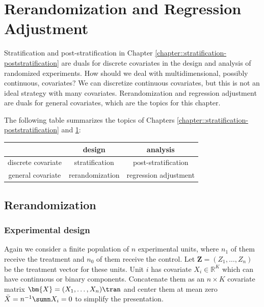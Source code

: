 
\chapter{Rerandomization and Regression Adjustment}
 \label{chapter:rerandomization-regression}


Stratification and post-stratification in Chapter  \ref{chapter::stratification-poststratification} are duals for discrete covariates in the design and analysis of randomized experiments.  How should we deal with multidimensional, possibly continuous, covariates? We can discretize continuous covariates, but this is not an ideal strategy with many covariates. Rerandomization and regression adjustment are duals for general covariates, which are the topics for this chapter. 


The following table summarizes the topics of Chapters  \ref{chapter::stratification-poststratification} and \ref{chapter:rerandomization-regression}:


\begin{center}
\begin{tabular}{c|c|c}
\hline 
 & design & analysis \\ 
 \hline 
 discrete covariate & stratification & post-stratification \\
 \hline 
 general covariate & rerandomization & regression adjustment \\
 \hline 
 \end{tabular}
\end{center}





\section{Rerandomization}

\subsection{Experimental design}
Again we consider a finite population of $n$ experimental units, where $n_1$ of them receive the treatment and $n_0$ of them receive the control. Let
 $\bm{Z} = (Z_1,\ldots, Z_n)$ be the treatment vector for these units. Unit $i$ has covariate $X_i \in \mathbb{R}^K$ which can have continuous or binary components. Concatenate them as an $n\times K$ covariate matrix $\bm{X} = (X_1 , \ldots, X_n )  \tran$ and center them at mean zero $\bar{X}  = n^{-1} \sumn X_i = 0$ to simplify the presentation. 

